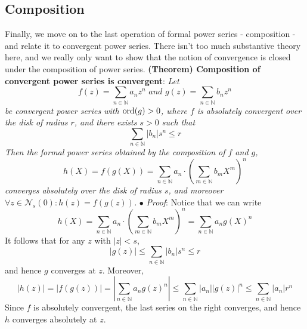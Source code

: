 \documentclass{article}
\newcommand*{\tb}{\textbf}
\newcommand*{\ti}{\textit}
\newcommand*{\n}{\newline}
\newcommand*{\nn}{\newline \newline}
\newcommand*{\Pf}{\indent \ensuremath{\bullet} \textit{Proof}: }
\newcommand*{\N}{\mathbb{N}}
\begin{document}
\subsection{Composition}
Finally, we move on to the last operation of formal power series - composition - and relate it to convergent power series. There isn't too much substantive theory here, and we really only want to show that the notion of convergence is closed under the composition of power series.
\nn
\tb{(Theorem) Composition of convergent power series is convergent}: \ti{Let}
    $$ f(z) = \sum_{n \in \N} a_n z^n \textit{ and } g(z) = \sum_{n \in \N} b_n z^n $$
\indent \ti{be convergent power series with $ \textnormal{ord}(g) > 0 $, where $ f $ is absolutely convergent over the disk of radius $ r $, and there exists $ s > 0 $ such that}
    $$ \sum_{n \in \N} | b_n | s^n \leq r $$
\indent \ti{Then the formal power series obtained by the composition of $ f $ and $ g $,}
    $$ h(X) = f(g(X)) = \sum_{n \in \N} a_n \cdot \left( \sum_{m \in \N} b_m X^m \right)^n $$
\indent \ti{converges absolutely over the disk of radius $ s $, and moreover $ \forall z \in \mathcal{N}_s(0): h(z) = f(g(z)) $.}
\n
\Pf Notice that we can write
    $$ h(X) = \sum_{n \in \N} a_n \cdot \left( \sum_{m \in \N} b_m X^m \right)^n = \sum_{n \in \N} a_n g(X)^n $$
It follows that for any $ z $ with $ | z | < s $,
    $$ | g(z) | \leq \sum_{n \in \N} | b_n | s^n \leq r $$
and hence $ g $ converges at $ z $. Moreover,
    $$ | h(z) | = | f(g(z)) | = \left \vert \sum_{n \in \N} a_n g(z)^n \right \vert \leq \sum_{n \in \N} | a_n | | g(z) |^n \leq \sum_{n \in \N} | a_n | r^n $$
Since $ f $ is absolutely convergent, the last series on the right converges, and hence $ h $ converges absolutely at $ z $. \qedsymbol
\end{document}
